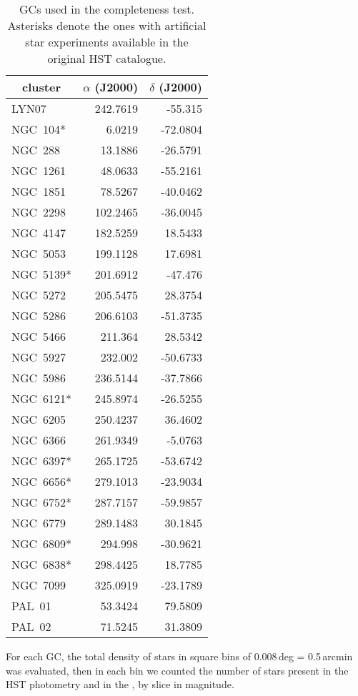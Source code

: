 \begin{table}
\centering\footnotesize
\caption{GCs used in the completeness test. 
Asterisks denote the ones with artificial star experiments available 
in the original HST catalogue.\label{chap:cu9val_T1}}
\begin{tabular}{lrr}
\hline\hline
\multicolumn{1}{c}{cluster} &\multicolumn{1}{c}{$\alpha$ (J2000)} &\multicolumn{1}{c}{$\delta$ (J2000)} \\
\hline
  LYN07 & 242.7619 & -55.315\\
  NGC~104* & 6.0219 & -72.0804\\
  NGC~288 & 13.1886 & -26.5791\\
  NGC~1261 & 48.0633 & -55.2161\\
  NGC~1851 & 78.5267 & -40.0462\\
  NGC~2298 & 102.2465 & -36.0045\\
  NGC~4147 & 182.5259 & 18.5433\\
  NGC~5053 & 199.1128 & 17.6981\\
  NGC~5139* & 201.6912 & -47.476\\
  NGC~5272 & 205.5475 & 28.3754\\
  NGC~5286 & 206.6103 & -51.3735\\
  NGC~5466 & 211.364 & 28.5342\\
  NGC~5927 & 232.002 & -50.6733\\
  NGC~5986 & 236.5144 & -37.7866\\
  NGC~6121* & 245.8974 & -26.5255\\
  NGC~6205 & 250.4237 & 36.4602\\
  NGC~6366 & 261.9349 & -5.0763\\
  NGC~6397* & 265.1725 & -53.6742\\
  NGC~6656* & 279.1013 & -23.9034\\
  NGC~6752* & 287.7157 & -59.9857\\
  NGC~6779 & 289.1483 & 30.1845\\
  NGC~6809* & 294.998 & -30.9621\\
  NGC~6838* & 298.4425 & 18.7785\\
  NGC~7099 & 325.0919 & -23.1789\\
  PAL~01 & 53.3424 & 79.5809\\
  PAL~02 & 71.5245 & 31.3809\\
\hline
\end{tabular}
\end{table}

For each GC, the total density of stars in square bins of 0.008\,deg = 0.5\,arcmin was evaluated, then in each bin we counted the number of stars present in the HST photometry and in the {}, by slice in magnitude. 



